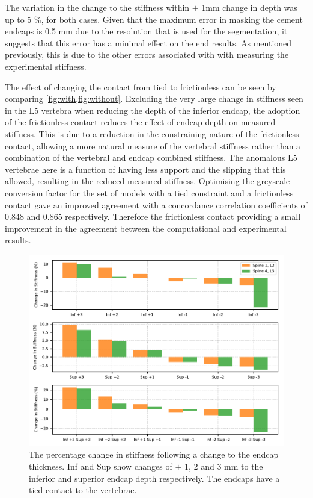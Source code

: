 The variation in the change to the stiffness within $\pm$ 1mm change in depth
was up to 5 \%, for both cases.
Given that the maximum error in masking the cement endcaps is 0.5 mm due to the
resolution that is used for the segmentation, it suggests that this error has a
minimal effect on the end results. As mentioned previously, this is due to the other errors associated with with measuring the experimental stiffness.

The effect of changing the contact from tied to frictionless can be seen by
comparing \cref{fig:with,fig:without}.
Excluding the very large change in stiffness seen in the L5 vertebra when
reducing the depth of the inferior endcap, the adoption of the frictionless
contact reduces the effect of endcap depth on
measured stiffness.
This is due to a reduction in the constraining nature of the frictionless
contact, allowing a more natural measure of the vertebral stiffness rather than a combination of the vertebral and endcap combined stiffness.
The anomalous L5 vertebrae here is a function of having less support and the
slipping that this allowed, resulting in the reduced measured stiffness.
Optimising the greyscale conversion factor for the set of models with a tied
constraint and a frictionless contact gave an improved agreement with a concordance correlation coefficients
of 0.848 and 0.865 respectively.
Therefore the frictionless contact providing a small improvement in the
agreement between the computational and experimental results.





\begin{figure}[h!]
\centering
\includegraphics[width=\textwidth]{Chapters/Chapter_HT_images/with.pdf}
\caption{The percentage change in stiffness following a change to the endcap
thickness. Inf and Sup show changes of $\pm$ 1, 2 and 3 mm to the inferior and
superior endcap depth respectively. The endcaps have a tied contact to the
vertebrae.}
\label{fig:with}
\end{figure}

